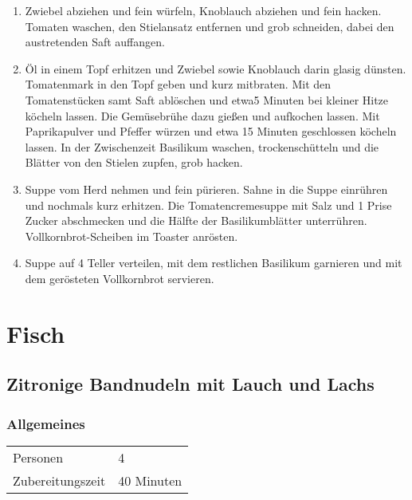 \begin{enumerate}
	\item Zwiebel abziehen und fein würfeln, Knoblauch abziehen und fein hacken. Tomaten waschen, den Stielansatz entfernen und grob schneiden, dabei den austretenden Saft auffangen.
	\item Öl in einem Topf erhitzen und Zwiebel sowie Knoblauch darin glasig dünsten. Tomatenmark in den Topf geben und kurz mitbraten. Mit den Tomatenstücken samt Saft ablöschen und etwa5 Minuten bei kleiner Hitze köcheln lassen. Die Gemüsebrühe dazu gießen und aufkochen lassen. Mit Paprikapulver und Pfeffer würzen und etwa 15 Minuten geschlossen köcheln lassen. In der Zwischenzeit Basilikum waschen, trockenschütteln und die Blätter von den Stielen zupfen, grob hacken.
	\item Suppe vom Herd nehmen und fein pürieren. Sahne in die Suppe einrühren und nochmals kurz erhitzen. Die Tomatencremesuppe mit Salz und 1 Prise Zucker abschmecken und die Hälfte der Basilikumblätter unterrühren. Vollkornbrot-Scheiben im Toaster anrösten.
	\item Suppe auf 4 Teller verteilen, mit dem restlichen Basilikum garnieren und mit dem gerösteten Vollkornbrot servieren.
\end{enumerate}


\section{Fisch}

\subsection{Zitronige Bandnudeln mit Lauch und Lachs}\label{sec:Lachs:LauchBandnudeln}
\subsubsection*{Allgemeines}
\begin{tabular}{ll}
    Personen         &  4   \\
    Zubereitungszeit & 40 Minuten  \\
\end{tabular} 
